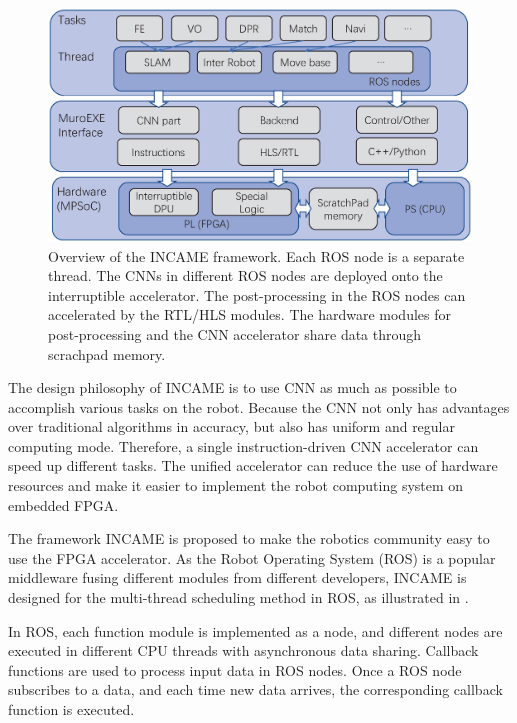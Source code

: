 \label{sec:incame}


\begin{figure}[t]
	\centering
    \includegraphics[width=0.99\linewidth]{fig/incame.eps}
    \caption{ Overview of the INCAME framework. Each ROS node is a separate thread. The CNNs in different ROS nodes are deployed onto the interruptible accelerator. The post-processing in the ROS nodes can accelerated by the RTL/HLS modules. The hardware modules for post-processing and the CNN accelerator share data through scrachpad memory. }
	\label{fig:incame}
\end{figure}

The design philosophy of INCAME is to use CNN as much as possible to accomplish various tasks on the robot. Because the CNN not only has advantages over traditional algorithms in accuracy, but also has uniform and regular computing mode. Therefore, a single instruction-driven CNN accelerator can speed up different tasks. The unified accelerator can reduce the use of hardware resources and make it easier to implement the robot computing system on embedded FPGA.

The framework INCAME is proposed to make the robotics community easy to use the FPGA accelerator. As the Robot Operating System (ROS) \cite{quigley2009ros} is a popular middleware fusing different modules from different developers, INCAME is designed for the multi-thread scheduling method in ROS, as illustrated in .

In ROS, each function module is implemented as a node, and different nodes are executed in different CPU threads with asynchronous data sharing. Callback functions are used to process input data in ROS nodes. Once a ROS node subscribes to a data, and each time new data arrives, the corresponding callback function is executed.


